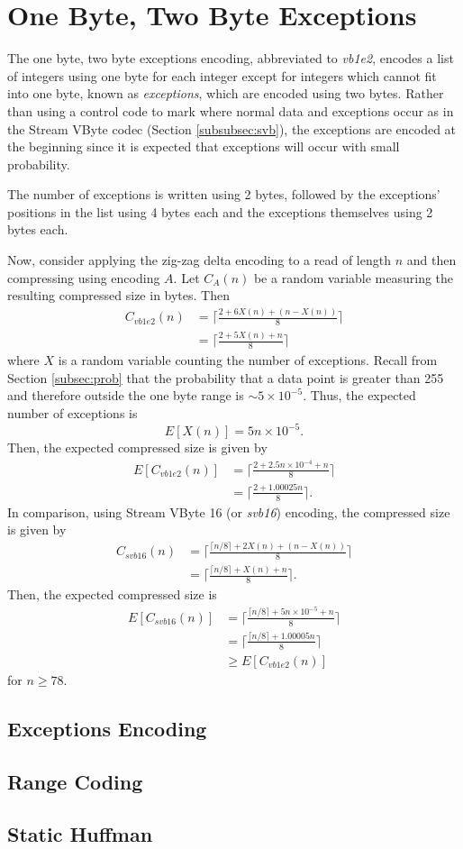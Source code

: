 \section{One Byte, Two Byte Exceptions}
\label{sec:vbbe21}

The one byte, two byte exceptions encoding, abbreviated to \textit{vb1e2}, encodes a list of integers using one byte for each integer except for integers which cannot fit into one byte, known as \textit{exceptions}, which are encoded using two bytes. Rather than using a control code to mark where normal data and exceptions occur as in the Stream VByte codec (Section \ref{subsubsec:svb}), the exceptions are encoded at the beginning since it is expected that exceptions will occur with small probability.

The number of exceptions is written using 2 bytes, followed by the exceptions' positions in the list using 4 bytes each and the exceptions themselves using 2 bytes each.

Now, consider applying the zig-zag delta encoding to a read of length $n$ and then compressing using encoding $A$. Let $C_A(n)$ be a random variable measuring the resulting compressed size in bytes. Then
\begin{align*}
	C_{vb1e2}(n) &= \lceil \frac{2 + 6X(n) + (n - X(n))}{8} \rceil\\
	&= \lceil \frac{2 + 5X(n) + n}{8} \rceil
\end{align*}
where $X$ is a random variable counting the number of exceptions.
Recall from Section \ref{subsec:prob} that the probability that a data point is greater than 255 and therefore outside the one byte range is $\sim 5\times 10^{-5}$. Thus, the expected number of exceptions is
\[ E[X(n)] = 5n \times 10^{-5}. \]
Then, the expected compressed size is given by
\begin{align*}
	E[C_{vb1e2}(n)] &= \lceil \frac{2 + 2.5n\times 10^{-4} + n}{8} \rceil\\
	&= \lceil \frac{2 + 1.00025n}{8} \rceil.
\end{align*}
In comparison, using Stream VByte 16 (or \textit{svb16}) encoding, the compressed size is given by
\begin{align*}
	C_{svb16}(n) &= \lceil \frac{\lceil n/8 \rceil + 2X(n) + (n - X(n))}{8} \rceil\\
	&= \lceil \frac{\lceil n/8 \rceil + X(n) + n}{8} \rceil.
\end{align*}
Then, the expected compressed size is
\begin{align*}
	E[C_{svb16}(n)] &= \lceil \frac{\lceil n/8 \rceil + 5n \times 10^{-5} + n}{8} \rceil\\
	&= \lceil \frac{\lceil n/8 \rceil + 1.00005n}{8} \rceil\\
	&\ge E[C_{vb1e2}(n)]
\end{align*}
for $n\ge 78$.

\subsection{Exceptions Encoding}

\subsection{Range Coding}

\subsection{Static Huffman}
